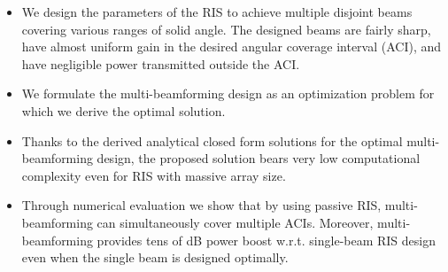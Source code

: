 \begin{itemize} 
    \item We design the parameters of the RIS to achieve multiple disjoint beams covering various ranges of solid angle. The designed beams are fairly sharp, have almost uniform gain in the desired angular coverage interval (ACI), and have negligible power transmitted outside the ACI.
    \item We formulate the multi-beamforming design as an optimization problem for which we derive the optimal solution.
    \item Thanks to the derived analytical closed form solutions for the optimal multi-beamforming design, the proposed solution bears very low computational complexity even for RIS with massive array size.
    \item Through numerical evaluation we show that by using passive RIS, multi-beamforming can simultaneously cover multiple ACIs. Moreover, multi-beamforming provides tens of dB power boost w.r.t. single-beam RIS design even when the single beam is designed optimally. 
\end{itemize}

